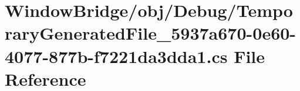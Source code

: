 \hypertarget{_window_bridge_2obj_2_debug_2_temporary_generated_file__5937a670-0e60-4077-877b-f7221da3dda1_8cs}{}\section{Window\+Bridge/obj/\+Debug/\+Temporary\+Generated\+File\+\_\+5937a670-\/0e60-\/4077-\/877b-\/f7221da3dda1.cs File Reference}
\label{_window_bridge_2obj_2_debug_2_temporary_generated_file__5937a670-0e60-4077-877b-f7221da3dda1_8cs}
